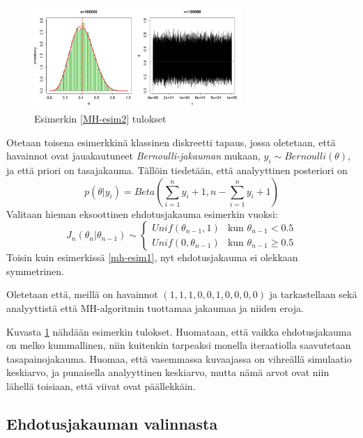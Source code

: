 \begin{esim}\label{MH-esim2}
	\begin{figure}[h!]
		\includegraphics[width=0.7\textwidth]{mhexample2}
		\caption[Yksiulotteinen Metropolis--Hastings esimerkki]{Esimerkin \ref{MH-esim2} tulokset}
		\label{kuva2}
	\end{figure}
	Otetaan toisena esimerkkinä klassinen diskreetti tapaus, jossa oletetaan, että havainnot ovat jauakautuneet \textit{Bernoulli-jakauman} mukaan, 
	$y_i \sim Bernoulli(\theta)$, 
	ja että priori on tasajakauma. Tällöin tiedetään, että analyyttinen posteriori on 
	\begin{equation*}
		p(\theta|y_i) = Beta(\sum_{i=1}^{n} y_i+1, n - \sum_{i=1}^{n} y_i+1)
	\end{equation*}
	Valitaan hieman eksoottinen ehdotusjakauma esimerkin vuoksi:
	\begin{equation}
		J_n(\theta_n|\theta_{n-1}) \sim \begin{cases}
			Unif(\theta_{n-1},1) & \text{kun } \theta_{n-1}<0.5 \\
			Unif(0,\theta_{n-1}) & \text{kun } \theta_{n-1}\geq0.5
		\end{cases}
	\end{equation}
	Toisin kuin esimerkissä \ref{mh-esim1}, nyt ehdotusjakauma ei olekkaan symmetrinen.
	
	Oletetaan että, meillä on havainnot $(1,1,1,0,0,1,0,0,0,0)$ ja tarkastellaan sekä analyyttistä että MH-algoritmin tuottamaa jakaumaa ja niiden eroja.

	Kuvasta \ref{kuva2} nähdään esimerkin tulokset. Huomataan, että vaikka ehdotusjakauma on melko kummallinen, niin kuitenkin tarpeaksi monella iteraatiolla saavutetaan tasapainojakauma. Huomaa, että vasemmassa kuvaajassa on vihreällä simulaatio keskiarvo, ja punaisella analyyttinen keskiarvo, mutta nämä arvot ovat niin lähellä toisiaan, että viivat ovat päällekkäin.
\end{esim}

\subsection{Ehdotusjakauman valinnasta}

